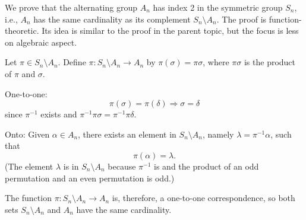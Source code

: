 \documentclass[12pt]{article}
\begin{document}
We prove that the alternating group $A_n$ has index 2 in the symmetric group $S_n$, i.e., $A_n$ has the same cardinality as its complement $S_n\setminus A_n$. The proof is function-theoretic. Its idea is similar to the proof in the parent topic, but the focus is less on algebraic aspect.


Let $\pi\in S_n\setminus A_n$. Define $\pi:S_n \setminus A_n\rightarrow A_n$ by $\pi(\sigma)=\pi\sigma$, where $\pi\sigma$ is the product of $\pi$ and $\sigma$.

One-to-one:
\begin{equation*}
\pi(\sigma)=\pi(\delta) \Longrightarrow \sigma=\delta
\end{equation*}
since $\pi^{-1}$ exists and $\pi^{-1}\pi\sigma=\pi^{-1}\pi\delta$.

Onto:
Given $\alpha\in A_n$, there exists an element in $S_n\setminus A_n$, namely $\lambda=\pi^{-1}\alpha$, such that
\begin{equation*}
\pi(\alpha)=\lambda.
\end{equation*}
(The element $\lambda$ is in $S_n\setminus A_n$ because $\pi^{-1}$ is and the product of an odd permutation and an even permutation is odd.)

The function $\pi:S_n \setminus A_n\rightarrow A_n$ is, therefore, a one-to-one correspondence, so both sets $S_n \setminus A_n$ and $A_n$ have the same cardinality. 
\end{document}
